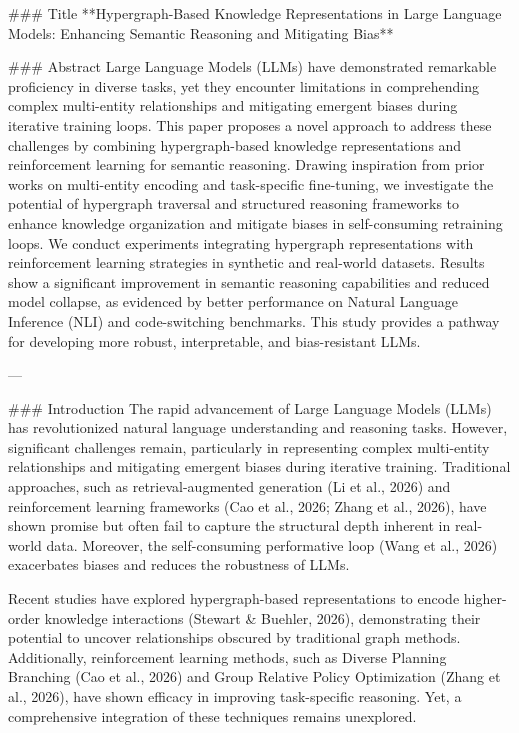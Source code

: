 ### Title
**Hypergraph-Based Knowledge Representations in Large Language Models: Enhancing Semantic Reasoning and Mitigating Bias**

### Abstract
Large Language Models (LLMs) have demonstrated remarkable proficiency in diverse tasks, yet they encounter limitations in comprehending complex multi-entity relationships and mitigating emergent biases during iterative training loops. This paper proposes a novel approach to address these challenges by combining hypergraph-based knowledge representations and reinforcement learning for semantic reasoning. Drawing inspiration from prior works on multi-entity encoding and task-specific fine-tuning, we investigate the potential of hypergraph traversal and structured reasoning frameworks to enhance knowledge organization and mitigate biases in self-consuming retraining loops. We conduct experiments integrating hypergraph representations with reinforcement learning strategies in synthetic and real-world datasets. Results show a significant improvement in semantic reasoning capabilities and reduced model collapse, as evidenced by better performance on Natural Language Inference (NLI) and code-switching benchmarks. This study provides a pathway for developing more robust, interpretable, and bias-resistant LLMs.

---

### Introduction
The rapid advancement of Large Language Models (LLMs) has revolutionized natural language understanding and reasoning tasks. However, significant challenges remain, particularly in representing complex multi-entity relationships and mitigating emergent biases during iterative training. Traditional approaches, such as retrieval-augmented generation (Li et al., 2026) and reinforcement learning frameworks (Cao et al., 2026; Zhang et al., 2026), have shown promise but often fail to capture the structural depth inherent in real-world data. Moreover, the self-consuming performative loop (Wang et al., 2026) exacerbates biases and reduces the robustness of LLMs.

Recent studies have explored hypergraph-based representations to encode higher-order knowledge interactions (Stewart & Buehler, 2026), demonstrating their potential to uncover relationships obscured by traditional graph methods. Additionally, reinforcement learning methods, such as Diverse Planning Branching (Cao et al., 2026) and Group Relative Policy Optimization (Zhang et al., 2026), have shown efficacy in improving task-specific reasoning. Yet, a comprehensive integration of these techniques remains unexplored.

